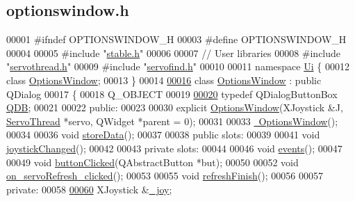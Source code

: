 \hypertarget{a00020_source}{}\subsection{optionswindow.\+h}

\begin{DoxyCode}
00001 \textcolor{preprocessor}{#ifndef OPTIONSWINDOW\_H}
00003 \textcolor{preprocessor}{#define OPTIONSWINDOW\_H}
00004 
00005 \textcolor{preprocessor}{#include "\hyperlink{a00025}{stable.h}"}
00006 
00007 \textcolor{comment}{// User libraries}
00008 \textcolor{preprocessor}{#include "\hyperlink{a00024}{servothread.h}"}
00009 \textcolor{preprocessor}{#include "\hyperlink{a00022}{servofind.h}"}
00010 
00011 \textcolor{keyword}{namespace }\hyperlink{a00027}{Ui} \{
00012 \textcolor{keyword}{class }\hyperlink{a00006}{OptionsWindow};
00013 \}
00014 
\hypertarget{a00020_source_l00016}{}\hyperlink{a00006}{00016} \textcolor{keyword}{class }\hyperlink{a00006}{OptionsWindow} : \textcolor{keyword}{public} QDialog
00017 \{
00018     Q\_OBJECT
00019     
\hypertarget{a00020_source_l00020}{}\hyperlink{a00006_aadac35a91eb1992c12e4ba6c4d5ad1be}{00020}     \textcolor{keyword}{typedef} QDialogButtonBox \hyperlink{a00006_aadac35a91eb1992c12e4ba6c4d5ad1be}{QDB};
00021     
00022 \textcolor{keyword}{public}:
00023     
00030     \textcolor{keyword}{explicit} \hyperlink{a00006_ae8e0a610d13a0478bdac57ec7cd4afba}{OptionsWindow}(XJoystick &J, \hyperlink{a00009}{ServoThread} *servo, QWidget *parent = 0);
00031     
00033     \hyperlink{a00006_a034c885fe8bb4416e732a9571d14a6b4}{~OptionsWindow}();
00034     
00036     \textcolor{keywordtype}{void} \hyperlink{a00006_ab0a56ad7347c20046602a7a2a1c83397}{storeData}();
00037     
00038 \textcolor{keyword}{public} slots:
00039     
00041     \textcolor{keywordtype}{void} \hyperlink{a00006_ae8c0373be58da710194f8d14f1c3c4dc}{joystickChanged}();
00042 
00043 \textcolor{keyword}{private} slots:
00044     
00046     \textcolor{keywordtype}{void} \hyperlink{a00006_a18763ff318688083c7ee5a21f22e8e98}{events}();
00047     
00049     \textcolor{keywordtype}{void} \hyperlink{a00006_a1f7d6790701ff9b1301533b8ad045ede}{buttonClicked}(QAbstractButton *but);
00050     
00052     \textcolor{keywordtype}{void} \hyperlink{a00006_ad5365d452e8bcd86cbb64b9ec42c3b7e}{on\_servoRefresh\_clicked}();
00053     
00055     \textcolor{keywordtype}{void} \hyperlink{a00006_ae52f8ca70b1bfa4c8d21d25e49e309d7}{refreshFinish}();
00056     
00057 \textcolor{keyword}{private}:
00058     
\hypertarget{a00020_source_l00060}{}\hyperlink{a00006_a1bf846ab681ab245f70adac30999947c}{00060}     XJoystick &\hyperlink{a00006_a1bf846ab681ab245f70adac30999947c}{\_joy};

\end{DoxyCode}
